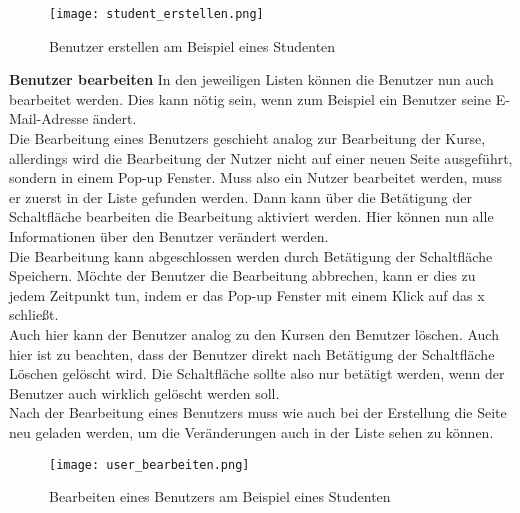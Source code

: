 \begin{figure}[h]
\centering
\texttt{[image: student\_erstellen.png]}
\caption{Benutzer erstellen am Beispiel eines Studenten}
\label{fib:kü}
\end{figure}

\textbf{Benutzer bearbeiten}
In den jeweiligen Listen können die Benutzer nun auch bearbeitet werden. Dies kann nötig sein, wenn zum Beispiel ein Benutzer seine E-Mail-Adresse ändert.\\
Die Bearbeitung eines Benutzers geschieht analog zur Bearbeitung der Kurse, allerdings wird die Bearbeitung der Nutzer nicht auf einer neuen Seite ausgeführt, sondern in einem Pop-up Fenster. Muss also ein Nutzer bearbeitet werden, muss er zuerst in der Liste gefunden werden. Dann kann über die Betätigung der Schaltfläche \glqq bearbeiten\grqq\: die Bearbeitung aktiviert werden. Hier können nun alle Informationen über den Benutzer verändert werden.\\ Die Bearbeitung kann abgeschlossen werden durch Betätigung der Schaltfläche \glqq Speichern\grqq . Möchte der Benutzer die Bearbeitung abbrechen, kann er dies zu jedem  Zeitpunkt tun, indem er das Pop-up Fenster mit einem Klick auf das \glqq x\grqq\: schließt.\\
Auch hier kann der Benutzer analog zu den Kursen den Benutzer löschen. Auch hier ist zu beachten, dass der Benutzer direkt nach Betätigung der Schaltfläche \glqq Löschen\grqq\: gelöscht wird. Die Schaltfläche sollte also nur betätigt werden, wenn der Benutzer auch wirklich gelöscht werden soll.\\
Nach der Bearbeitung eines Benutzers muss wie auch bei der Erstellung die Seite neu geladen werden, um die Veränderungen auch in der Liste sehen zu können.\\

\begin{figure}[h]
\centering
\texttt{[image: user\_bearbeiten.png]}
\caption{Bearbeiten eines Benutzers am Beispiel eines Studenten}
\label{fib:kü}
\end{figure}
